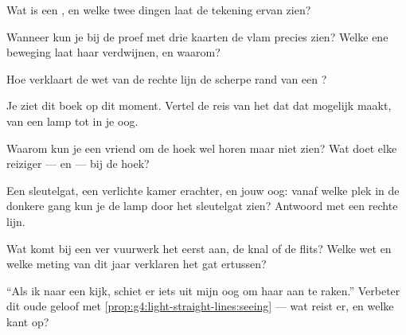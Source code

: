\begin{exercise}[$\star$]\label{exo:g4:light-straight-lines:2}
Wat is een , en welke twee dingen laat de tekening ervan
zien?
\end{exercise}

\begin{exercise}[$\star$]\label{exo:g4:light-straight-lines:3}
Wanneer kun je bij de proef met drie kaarten de vlam precies zien?
Welke ene beweging laat haar verdwijnen, en waarom?
\end{exercise}

\begin{exercise}[$\star$]\label{exo:g4:light-straight-lines:4}
Hoe verklaart de wet van de rechte lijn de scherpe rand van een
?
\end{exercise}

\begin{exercise}[$\star$]\label{exo:g4:light-straight-lines:5}
Je ziet dit boek op dit moment. Vertel de reis van het  dat dat
mogelijk maakt, van een lamp tot in je oog.
\end{exercise}

\begin{exercise}[$\star$]\label{exo:g4:light-straight-lines:6}
Waarom kun je een vriend om de hoek wel horen maar niet zien? Wat doet
elke reiziger ---  en  --- bij de hoek?
\end{exercise}

\begin{exercise}[$\star$]\label{exo:g4:light-straight-lines:7}
Een sleutelgat, een verlichte kamer erachter, en jouw oog: vanaf welke
plek in de donkere gang kun je de lamp door het sleutelgat zien?
Antwoord met een rechte lijn.
\end{exercise}

\begin{exercise}[$\star$]\label{exo:g4:light-straight-lines:8}
Wat komt bij een ver vuurwerk het eerst aan, de knal of de flits?
Welke wet en welke meting van dit jaar verklaren het gat ertussen?
\end{exercise}

\begin{exercise}[$\star$]\label{exo:g4:light-straight-lines:9}
``Als ik naar een  kijk, schiet er iets uit mijn oog om haar aan
te raken.'' Verbeter dit oude geloof met
\cref{prop:g4:light-straight-lines:seeing} --- wat reist er, en welke
kant op?
\end{exercise}


